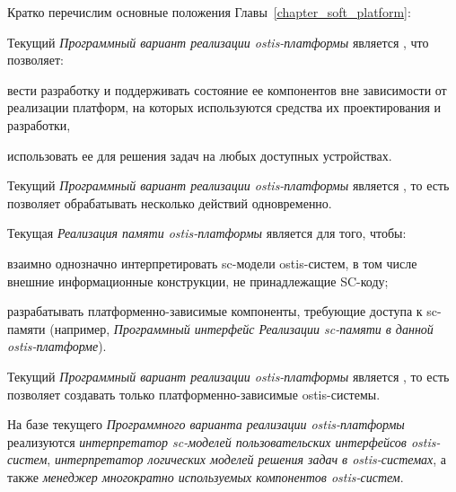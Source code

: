 Кратко перечислим основные положения Главы~\ref{chapter_soft_platform}:
\begin{textitemize}
	\item Текущий \textit{Программный вариант реализации ostis-платформы} является , что позволяет:
	\begin{textitemize}
		\item вести разработку и поддерживать состояние ее компонентов вне зависимости от реализации платформ, на которых используются средства их проектирования и разработки,
		\item использовать ее для решения задач на любых доступных устройствах.
	\end{textitemize}
	\item Текущий \textit{Программный вариант реализации ostis-платформы} является , то есть позволяет обрабатывать несколько действий одновременно.
	\item Текущая \textit{Реализация памяти ostis-платформы} является  для того, чтобы:
		\begin{textitemize}
		\item взаимно однозначно интерпретировать sc-модели ostis-систем, в том числе внешние информационные конструкции, не принадлежащие SC-коду;
		\item разрабатывать платформенно-зависимые компоненты, требующие доступа к sc-памяти (например, \textit{Программный интерфейс Реализации sc-памяти в данной ostis-платформе}).
	\end{textitemize}
	\item Текущий \textit{Программный вариант реализации ostis-платформы} является , то есть позволяет создавать только платформенно-зависимые ostis-системы.
	\item На базе текущего \textit{Программного варианта реализации ostis-платформы} реализуются \textit{интерпретатор sc-моделей пользовательских интерфейсов ostis-систем}, \textit{интерпретатор логических моделей решения задач в ostis-системах}, а также \textit{менеджер многократно используемых компонентов ostis-систем}.
\end{textitemize}